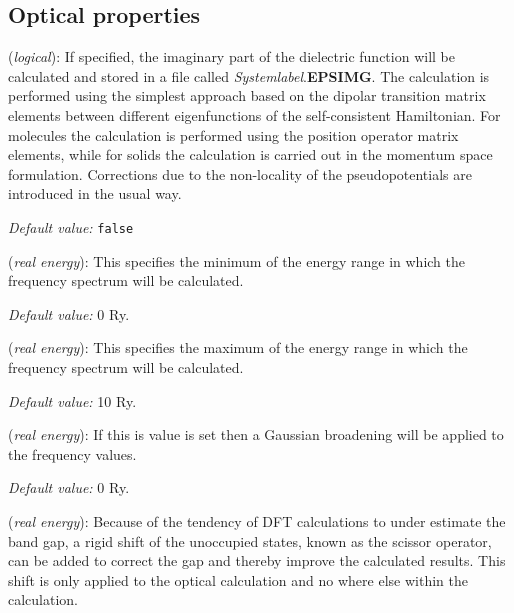 \documentclass[11pt]{article}
\begin{document}
\vspace{5pt}
\subsection{Optical properties}

\begin{description}
\itemsep 10pt
\parsep 0pt

\item[{\bf OpticalCalculation}] ({\it logical}): 
If specified, the imaginary part of the dielectric function
will be calculated and stored in a file called {\it Systemlabel}.{\bf EPSIMG}.
The calculation is performed using the simplest approach based on the
dipolar transition matrix elements between different eigenfunctions
of the self-consistent Hamiltonian. For molecules the calculation 
is performed using the position operator matrix elements, while
for solids the calculation is carried out in the momentum space
formulation.
Corrections due to the non-locality of the pseudopotentials
are introduced in the usual way. 

{\it Default value:} {\tt false}

\item[{\bf Optical.EnergyMinimum}] ({\it real energy}):
This specifies the minimum of the energy range in which
the frequency spectrum will be calculated.

{\it Default value:} 0 Ry.

\item[{\bf Optical.EnergyMaximum}] ({\it real energy}):
This specifies the maximum of the energy range in which
the frequency spectrum will be calculated.

{\it Default value:} 10 Ry.

\item[{\bf Optical.Broaden}] ({\it real energy}):
If this is value is set then a Gaussian broadening will be
applied to the frequency values.

{\it Default value:} 0 Ry.

\item[{\bf Optical.Scissor}] ({\it real energy}):
Because of the tendency of DFT calculations to under estimate
the band gap, a rigid shift of the unoccupied states, known as 
the scissor operator, can be added to correct the gap and
thereby improve the calculated results. This shift is only
applied to the optical calculation and no where else within
the calculation.


\end{description}
\end{document}
